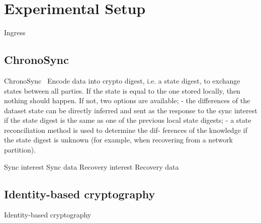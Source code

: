 \chapter{Experimental Setup}\label{chp:experimental_setup}
Ingress


\section{ChronoSync}
ChronoSync~\cite{DBLP:conf/icnp/ZhuA13}
Encode data into crypto digest, i.e. a state digest, to exchange states between all parties. 
If the state is equal to the one stored locally, then nothing should happen.
If not, two options are available; 
- the differences of the dataset state can be directly inferred
and sent as the response to the sync interest if the state
digest is the same as one of the previous local state
digests;
- a state reconciliation method is used to determine the dif-
ferences of the knowledge if the state digest is unknown
(for example, when recovering from a network partition).

Sync interest
Sync data
Recovery interest
Recovery data

\section{Identity-based cryptography}
Identity-based cryptography~\cite{DBLP:conf/icnp/ZhangCXWSW11}